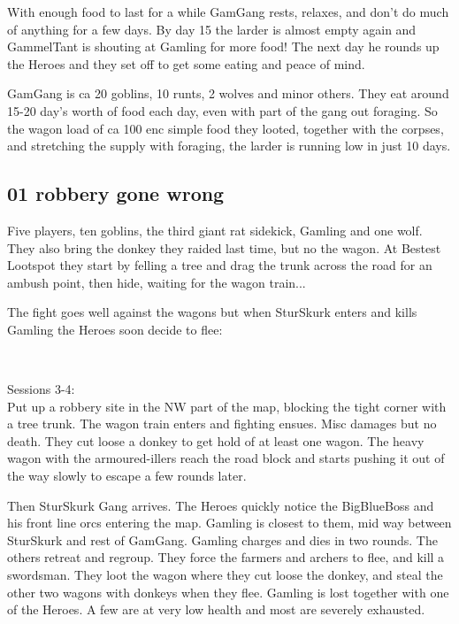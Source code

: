 With enough food to last for a while GamGang rests, relaxes, and don't do much of anything for a few days. By day 15 the larder is almost empty again and GammelTant is shouting at Gamling for more food! The next day he rounds up the Heroes and they set off to get some eating and peace of mind.

GamGang is ca 20 goblins, 10 runts, 2 wolves and minor others. They eat around 15-20 day's worth of food each day, even with part of the gang out foraging. So the wagon load of ca 100 enc simple food they looted, together with the corpses, and stretching the supply with foraging, the larder is running low in just 10 days.


\subsection*{01 robbery gone wrong}

Five players, ten goblins, the third giant rat sidekick, Gamling and one wolf. They also bring the donkey they raided last time, but no the wagon. At Bestest Lootspot they start by felling a tree and drag the trunk across the road for an ambush point, then hide, waiting for the wagon train...

The fight goes well against the wagons but when SturSkurk enters and kills Gamling the Heroes soon decide to flee:

\


Sessions 3-4:\\                                                 %
Put up a robbery site in the NW part of the map, blocking the tight corner with a tree trunk. The wagon train enters and fighting ensues. Misc damages but no death. They cut loose a donkey to get hold of at least one wagon. The heavy wagon with the armoured-illers reach the road block and starts pushing it out of the way slowly to escape a few rounds later.

Then SturSkurk Gang arrives. The Heroes quickly notice the BigBlueBoss and his front line orcs entering the map. Gamling is closest to them, mid way between SturSkurk and rest of GamGang. Gamling charges and dies in two rounds. The others retreat and regroup. They force the farmers and archers to flee, and kill a swordsman. They loot the wagon where they cut loose the donkey, and steal the other two wagons with donkeys when they flee. Gamling is lost together with one of the Heroes. A few are at very low health and most are severely exhausted.


